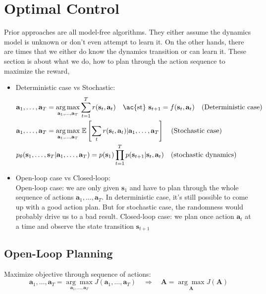 \chapter{Optimal Control}
\label{sec:optimal-control}
Prior approaches are all model-free algorithms. They either assume the dynamics model is unknown or don't even attempt to learn it. On the other hands, there are times that we either do know the dynamics transition or can learn it.  These section is about what we do, how to plan through the action sequence to maximize the reward, 

\begin{itemize}
	\item Deterministic case vs Stochastic:
	\begin{align}
		&\textbf{a}_1, \dots, \textbf{a}_T 	= \underset{\textbf{a}_1, \dots, \textbf{a}_T}{\arg\max} \sum_{t=1}^T r(\textbf{s}_t, \textbf{a}_t) \quad \text{\ac{st} } \textbf{s}_{t+1} = f(\textbf{s}_t, \textbf{a}_t) \quad \text{(Deterministic case)}\\
		&\textbf{a}_1, \dots, \textbf{a}_T = \underset{\textbf{a}_1, \dots, \textbf{a}_T}{\arg\max}\; \mathbb{E} \left[ \sum_t r(\textbf{s}_t, \textbf{a}_t) | \textbf{a}_1, \dots, \textbf{a}_T \right] \quad \text{(Stochastic case)}\\
		&p_\theta(\textbf{s}_1, \dots, \textbf{s}_T | \textbf{a}_1, \dots, \textbf{a}_T) = p(\textbf{s}_1) \prod_{t=1}^T p(\textbf{s}_{t+1} | \textbf{s}_t, \textbf{a}_t) \quad \text{(stochastic dynamics)}
	\end{align}
	\item Open-loop case vs Closed-loop:\\
	Open-loop case: we are only given $\textbf{s}_1$ and have to plan through the whole sequence of actions $\textbf{a}_1, \dots, \textbf{a}_T$. In deterministic case, it's still possible to come up with a good action plan. But for stochastic case, the randomness would probably drive us to a bad result. Closed-loop case: we plan once action $\textbf{a}_t$ at a time and observe the state transition $\textbf{s}_{t+1}$
\end{itemize}

\section{Open-Loop Planning}
Maximize objective through sequence of actions:
\begin{equation}
	\textbf{a}_1, \dots, \textbf{a}_T = \underset{\textbf{a}_1, \dots, \textbf{a}_T}{\arg\max} J(\textbf{a}_1, \dots, \textbf{a}_T) \quad\Rightarrow\quad \textbf{A} = \underset{\textbf{A}}{\arg\max} J(\textbf{A})
\end{equation}

